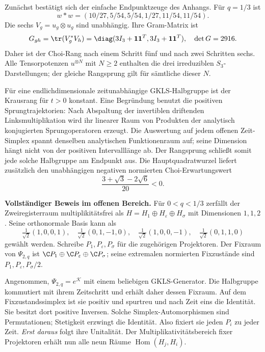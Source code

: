 Zunächst bestätigt sich der einfache Endpunktzeuge des Anhangs. Für $q=1/3$ ist
\begin{equation}
w*w=(10/27,5/54,5/54,1/27,11/54,11/54).
\end{equation}
Die sechs $V_g=u_g\otimes u_g$ sind unabhängig. Ihre Gram-Matrix ist
\begin{equation}
G_{gh}=\tr(V_g^*V_h)=\diag(3I_3+\mathbf1\mathbf1^T,3I_3+\mathbf1\mathbf1^T),
\quad \det G=2916.
\end{equation}
Daher ist der Choi-Rang nach einem Schritt fünf und nach zwei Schritten sechs. Alle Tensorpotenzen $u^{\otimes N}$ mit $N\ge2$ enthalten die drei irreduziblen $S_3$-Darstellungen; der gleiche Rangsprung gilt für sämtliche dieser $N$.

Für eine endlichdimensionale zeitunabhängige GKLS-Halbgruppe ist der Krausrang für $t>0$ konstant. Eine Begründung benutzt die positiven Sprungtrajektorien: Nach Abspaltung der invertiblen driftenden Linksmultiplikation wird ihr linearer Raum von Produkten der analytisch konjugierten Sprungoperatoren erzeugt. Die Auswertung auf jedem offenen Zeit-Simplex spannt denselben analytischen Funktionenraum auf; seine Dimension hängt nicht von der positiven Intervalllänge ab. Der Rangsprung schließt somit jede solche Halbgruppe am Endpunkt aus. Die Hauptquadratwurzel liefert zusätzlich den unabhängigen negativen normierten Choi-Erwartungswert
\begin{equation}
\frac{3+\sqrt3-2\sqrt6}{20}<0.
\end{equation}

\textbf{Vollständiger Beweis im offenen Bereich.}
Für $0<q<1/3$ zerfällt der Zweiregisterraum multiplikitätsfrei als
$H=H_1\oplus H_\varepsilon\oplus H_\sigma$ mit Dimensionen $1,1,2$.
Seine orthonormale Basis kann als
\begin{equation}
\tfrac1{\sqrt2}(1,0,0,1),\quad
\tfrac1{\sqrt2}(0,1,-1,0),\quad
\tfrac1{\sqrt2}(1,0,0,-1),\quad
\tfrac1{\sqrt2}(0,1,1,0)
\end{equation}
gewählt werden. Schreibe $P_1,P_\varepsilon,P_\sigma$ für die zugehörigen Projektoren. Der Fixraum von $\Psi_{2,q}$ ist
$\C P_1\oplus\C P_\varepsilon\oplus\C P_\sigma$; seine extremalen normierten Fixzustände sind $P_1,P_\varepsilon,P_\sigma/2$.

Angenommen, $\Psi_{2,q}=e^{\mathcal K}$ mit einem beliebigen GKLS-Generator.
Die Halbgruppe kommutiert mit ihrem Zeitschritt und erhält daher dessen Fixraum. Auf dem Fixzustandssimplex ist sie positiv und spurtreu und nach Zeit eins die Identität. Sie besitzt dort positive Inversen. Solche Simplex-Automorphismen sind Permutationen; Stetigkeit erzwingt die Identität. Also fixiert sie jeden $P_i$ zu jeder Zeit. \emph{Erst daraus} folgt ihre Unitalität. Der Multiplikativitätsbereich fixer Projektoren erhält nun alle neun Räume $\operatorname{Hom}(H_j,H_i)$.

